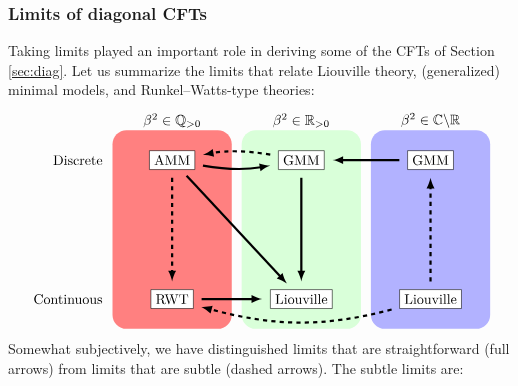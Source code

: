 \documentclass[12pt, a4paper]{article}
\theoremstyle{break}
\begin{document}
\subsubsection{Limits of diagonal CFTs}\label{sec:lod}

Taking limits played an important role in deriving some of the CFTs of Section \ref{sec:diag}. 
Let us summarize the limits that relate Liouville theory, (generalized) minimal models, and Runkel--Watts-type theories: 
\begin{align}
\begin{tikzpicture}[scale = .25, baseline=(current  bounding  box.center)]
\fill[red!50, rounded corners = 10] (-6, -10) rectangle (6, 10);
\fill[green!15, rounded corners = 10] (7, -10) rectangle (19, 10);
\fill[blue!30, rounded corners = 10] (20, -10) rectangle (32, 10);
\node at (0, 11) {$\beta^2\in\mathbb{Q}_{>0}$};
\node at (13, 11) {$\beta^2\in\mathbb{R}_{>0}$};
\node at (26, 11) {$\beta^2\in \mathbb{C}\backslash \mathbb{R}$};
\node[left] at (-6.5, 7) {Discrete};
\node[left] at (-6.5, -7) {Continuous};
\draw (0, 7) node[draw, fill = white] (mm) {AMM};
\draw (13, 7) node[draw, fill = white] (gmm1) {GMM};
\draw (26, 7) node[draw, fill = white] (gmm2) {GMM};
\draw (0, -7) node[draw, fill = white] (rwt) {RWT};
\draw (13, -7) node[draw, fill = white] (clo) {Liouville};
\draw (26, -7) node[draw, fill = white] (liou) {Liouville};
\draw [ultra thick, shorten <= 2mm, shorten >= 2mm, -latex, 
       out = -10, in = -170] (mm) to (gmm1);
\draw [ultra thick, shorten <= 2mm, shorten >= 2mm, -latex, dashed,
       out = 170, in = 10] (gmm1) to (mm);
\draw [ultra thick, shorten <= 2mm, shorten >= 2mm, -latex] (gmm2) to (gmm1);
\draw [ultra thick, shorten <= 2mm, shorten >= 2mm, -latex] (mm) to (clo);
\draw [ultra thick, shorten <= 2mm, shorten >= 2mm, -latex, dashed] (mm) to (rwt);
\draw [ultra thick, shorten <= 2mm, shorten >= 2mm, -latex] (rwt) to (clo);
\draw [ultra thick, shorten <= 2mm, shorten >= 2mm, -latex] (gmm1) to (clo);
\draw [ultra thick, shorten <= 2mm, shorten >= 2mm, -latex,
       out = -165, in = -15, dashed] (liou) to (rwt);
\draw [ultra thick, shorten <= 2mm, shorten >= 2mm, -latex, dashed] (liou) to (gmm2);
\end{tikzpicture}
\label{lims}
\end{align}
Somewhat subjectively, we have distinguished limits that are straightforward (full arrows) from limits that are subtle (dashed arrows). The subtle limits are:
\end{document}
